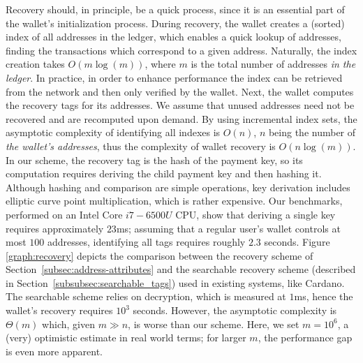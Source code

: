 Recovery should, in principle, be a quick process, since it is an essential
part of the wallet's initialization process. During recovery, the wallet
creates a (sorted) index of all addresses in the ledger, which enables a quick
lookup of addresses, \ie finding the transactions which correspond to a given
address. Naturally, the index creation takes $O(m\log(m))$, where $m$ is the
total number of addresses \emph{in the ledger}. In practice, in order to
enhance performance the index can be retrieved from the network and then only
verified by the wallet. Next, the wallet computes the recovery tags for its
addresses. We assume that unused addresses need not be recovered and are
recomputed upon demand. By using incremental index sets, the asymptotic
complexity of identifying all indexes is $O(n)$, $n$ being the number of
\emph{the wallet's addresses}, thus the complexity of wallet recovery is
$O(n\log(m))$. In our scheme, the recovery tag is the hash of the payment key,
so its computation requires deriving the child payment key and then hashing it.
Although hashing and comparison are simple operations, key derivation includes
elliptic curve point multiplication, which is rather expensive. Our benchmarks,
performed on an Intel Core $i7-6500U$ CPU, show that deriving a single key
requires approximately $23$ms; assuming that a regular user's wallet controls
at most $100$ addresses, identifying all tags requires roughly $2.3$ seconds.
Figure \ref{graph:recovery} depicts the comparison between the recovery scheme
of Section~\ref{subsec:address-attributes} and the searchable recovery scheme
(described in Section~\ref{subsubsec:searchable_tags}) used in existing
systems, like Cardano. The searchable scheme relies on decryption, which is
measured at $1$ms, hence the wallet's recovery requires $10^3$ seconds.
However, the asymptotic complexity is $\Theta(m)$ which, given $m \gg n$, is
worse than our scheme. Here, we set $m = 10^6$, a (very) optimistic estimate in
real world terms; for larger $m$, the performance gap is even more apparent.

